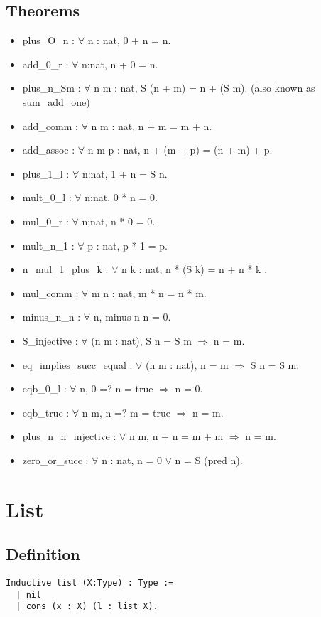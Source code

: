 \documentclass[12pt,a4paper]{article}
\theoremstyle{case}
\begin{document}
\subsection{Theorems}
\begin{itemize}
    \item plus\_O\_n : $\forall$ n : nat, 0 + n = n.
    \item add\_0\_r : $\forall$ n:nat, n + 0 = n.
    \item plus\_n\_Sm : $\forall$ n m : nat, S (n + m) = n + (S m). (also known as sum\_add\_one)
    \item add\_comm : $\forall$ n m : nat, n + m = m + n.
    \item add\_assoc : $\forall$ n m p : nat, n + (m + p) = (n + m) + p.
    \item plus\_1\_l : $\forall$ n:nat, 1 + n = S n.
    \item mult\_0\_l : $\forall$ n:nat, 0 * n = 0.
    \item mul\_0\_r : $\forall$ n:nat, n * 0 = 0.
    \item mult\_n\_1 : $\forall$ p : nat, p * 1 = p. 
    \item n\_mul\_1\_plus\_k : $\forall$ n k : nat, n * (S k) = n + n * k .
    \item mul\_comm : $\forall$ m n : nat, m * n = n * m.
    \item minus\_n\_n : $\forall$ n, minus n n = 0.
    \item S\_injective : $\forall$ (n m : nat), S n = S m $\Rightarrow$ n = m.
    \item eq\_implies\_succ\_equal : $\forall$ (n m : nat), n = m $\Rightarrow$ S n = S m.
    \item eqb\_0\_l : $\forall$ n, 0 =? n = true $\Rightarrow$ n = 0.
    \item eqb\_true : $\forall$ n m, n =? m = true $\Rightarrow$ n = m.
    \item plus\_n\_n\_injective : $\forall$ n m, n + n = m + m $\Rightarrow$ n = m.
    \item zero\_or\_succ : $\forall$ n : nat, n = 0 $\lor$ n = S (pred n).
    

\end{itemize}



\section{List}
\subsection{Definition}
\begin{verbatim}
Inductive list (X:Type) : Type :=
  | nil
  | cons (x : X) (l : list X).
\end{verbatim}
\end{document}
